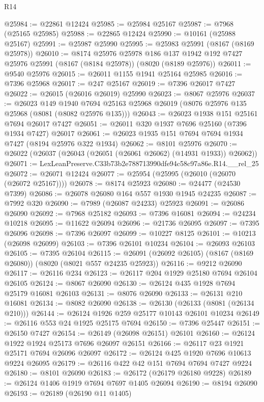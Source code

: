 \begin{lexlean}{R14}
\begin{coremodule}
@25984 := @22861 @12424
@25985 := @25984 @25167
@25987 := @7968 (@25165 @25985)
@25988 := @22865 @12424
@25990 := @10161 (@25988 @25167)
@25991 := @25987 @25990
@25995 := @25983 @25991 (@8167 (@8169 @25978))
@26010 := @8174
    @25976
    @25978
    @186
    @137
    @1942
    @192
    @7427
    @25976
    @25991
    (@8167 (@8184 @25978))
    (@8020 (@8189 @25976))
@26011 := @9540 @25976
@26015 := @26011 @1155 @1941 @25164 @25985
@26016 := @7396 @25968
@26017 := @247 @25167
@26019 := @7396 @26017 @7427
@26022 := @26015 (@26016 @26019) @25990
@26023 := @8067 @25976
@26037 := @26023
    @149
    @1940
    @7694
    @25163
    @25968
    @26019
    (@8076 @25976 @135 @25968 (@8081 (@8082 @25976 @135)))
@26043 := @26023 @1938 @151 @25161 @7694 @26017 @7427
@26051 := @26011 @320 @1937 @7696 @25160 (@7396 @1934 @7427) @26017
@26061 := @26023 @1935 @151 @7694 @7694 @1934 @7427 (@8194 @25976 @322 @1934)
@26062 := @8101 @25976
@26070 := @26022 (@26037 (@26043 (@26051 (@26061 @26062) (@14931 @1933)) @26062))
@26071 := LexLeanPreserve.C33b73b2e788713990dfe94c58c97a86e.R14.__rel_25
@26072 := @26071 @12424
@26077 := @25954 (@25995 (@26010 (@26070 (@26072 @25167))))
@26078 := @8174 @25923
@26080 := @24477 (@24530 @7399)
@26086 := @26078 @26080 @164 @557 @1930 @1945 @24235
@26087 := @7992 @320
@26090 := @7989 (@26087 @24233) @25923
@26091 := @26086 @26090
@26092 := @7968 @25182
@26093 := @7396 @16081
@26094 := @24234 @10218
@26095 := @11622 @26094
@26096 := @21736 @26095
@26097 := @7395 @26096
@26098 := @7396 @26097
@26099 := @10227 @8125
@26101 := @10213 (@26098 @26099)
@26103 := @7396 @26101 @10234
@26104 := @26093 @26103
@26105 := @7395 @26104
@26115 := @26091 (@26092 @26105) (@8167 (@8169 @26080)) (@8020 (@8021 @557 @24235 @25923))
@26116 := @9212 @26090
@26117 := @26116 @234
@26123 := @26117 @204 @1929 @25180 @7694 @26104 @26105
@26124 := @8067 @26090
@26130 := @26124 @435 @1928 @7694 @25179 @16081 @26103
@26131 := @8076 @26090
@26133 := @26131 @210 @16081
@26134 := @8082 @26090
@26138 := @26130 (@26133 (@8081 (@26134 @210)))
@26144 := @26124 @1926 @259 @25177 @10143 @26101 @10234
@26149 := @26116 @553 @24 @1925 @25175 @7694
@26150 := @7396 @25447
@26151 := @26150 @7427
@26154 := @26149 (@26098 @26151) @26101
@26160 := @26124 @1922 @1924 @25173 @7696 @26097 @26151
@26166 := @26117 @23 @1921 @25171 @7694 @26096 @26097
@26172 := @26124 @425 @1920 @7696 @10613 @9224 @26095
@26179 := @26116 @422 @42 @151 @7694 @7694 @7427 @9224
@26180 := @8101 @26090
@26183 := @26172 (@26179 @26180 @9228)
@26189 := @26124 @1406 @1919 @7694 @7697 @1405 @26094
@26190 := @8194 @26090
@26193 := @26189 (@26190 @11 @1405)

\end{coremodule}
\end{lexlean}
